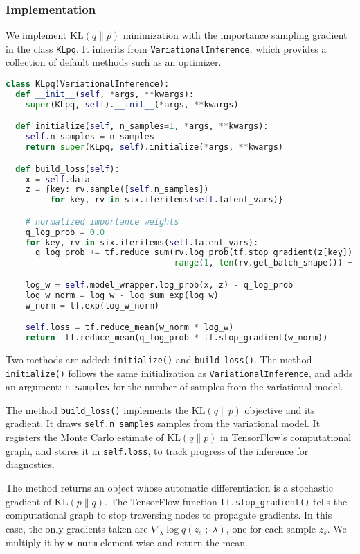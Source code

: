 \subsubsection{Implementation}

We implement $\text{KL}(q\|p)$ minimization with the importance
sampling gradient in the class \texttt{KLpq}. It inherits from
\texttt{VariationalInference}, which provides a collection of default
methods such as an optimizer.

\begin{lstlisting}[language=Python]
class KLpq(VariationalInference):
  def __init__(self, *args, **kwargs):
    super(KLpq, self).__init__(*args, **kwargs)

  def initialize(self, n_samples=1, *args, **kwargs):
    self.n_samples = n_samples
    return super(KLpq, self).initialize(*args, **kwargs)

  def build_loss(self):
    x = self.data
    z = {key: rv.sample([self.n_samples])
         for key, rv in six.iteritems(self.latent_vars)}

    # normalized importance weights
    q_log_prob = 0.0
    for key, rv in six.iteritems(self.latent_vars):
      q_log_prob += tf.reduce_sum(rv.log_prob(tf.stop_gradient(z[key])),
                                  range(1, len(rv.get_batch_shape()) + 1))

    log_w = self.model_wrapper.log_prob(x, z) - q_log_prob
    log_w_norm = log_w - log_sum_exp(log_w)
    w_norm = tf.exp(log_w_norm)

    self.loss = tf.reduce_mean(w_norm * log_w)
    return -tf.reduce_mean(q_log_prob * tf.stop_gradient(w_norm))
\end{lstlisting}

Two methods are added: \texttt{initialize()} and
\texttt{build_loss()}. The method \texttt{initialize()}
follows the same initialization as \texttt{VariationalInference}, and
adds an argument: \texttt{n_samples} for the number of samples from
the variational model.

The method \texttt{build_loss()} implements the $\text{KL}(q\|p)$
objective and its gradient. It draws \texttt{self.n_samples} samples from the
variational model. It registers the Monte Carlo
estimate of $\text{KL}(q\|p)$ in TensorFlow's computational graph, and stores it
in \texttt{self.loss}, to track progress of the inference for diagnostics.

The method returns an object whose
automatic differentiation is a stochastic gradient of $\text{KL}(p\|q)$.
The TensorFlow function \texttt{tf.stop_gradient()} tells the computational
graph to stop traversing nodes to propagate gradients. In this case,
the only gradients taken are $\nabla_\lambda \log q(z_s\;;\;\lambda)$,
one for each sample $z_s$. We multiply it by \texttt{w_norm}
element-wise and return the mean.

